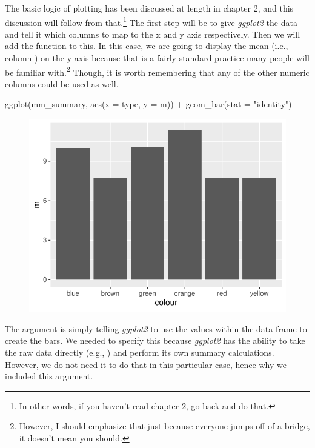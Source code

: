 The basic logic of plotting has been discussed at length in chapter 2, and this discussion will follow from that.\footnote{In other words, if you haven't read chapter 2, go back and do that.} The first step will be to give \textit{ggplot2} the data and tell it which columns to map to the x and y axis respectively. Then we will add the  function to this. In this case, we are going to display the mean (i.e., column ) on the y-axis because that is a fairly standard practice many people will be familiar with.\footnote{However, I should emphasize that just because everyone jumps off of a bridge, it doesn't mean you should.} Though, it is worth remembering that any of the other numeric columns could be used as well.

\begin{inR}
ggplot(mm_summary, aes(x = type, y = m)) +
  geom_bar(stat = "identity")
\end{inR}

\vspace{2em}

\begin{figure}[H]
\includegraphics[scale = .75]{graphics/ch3Figs/bar_1.pdf}
\end{figure}

The argument  is simply telling \textit{ggplot2} to use the values within the  data frame to create the bars.  We needed to specify this because \textit{ggplot2} has the ability to take the raw data directly (e.g., ) and perform its own summary calculations. However, we do not need it to do that in this particular case, hence why we included this argument.

